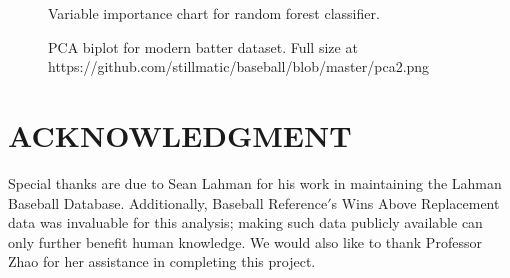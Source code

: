 \documentclass[letterpaper, 10 pt, conference]{ieeeconf}
\begin{document}
\begin{figure}[thpb]
\centering
{}
\caption{Variable importance chart for random forest classifier.}
\label{figurelabel}
\end{figure}

\begin{figure}[thpb]
\centering
{}
\caption{PCA biplot for modern batter dataset. Full size at https://github.com/stillmatic/baseball/blob/master/pca2.png}
\label{figurelabel}
\end{figure}

\section*{ACKNOWLEDGMENT}

Special thanks are due to Sean Lahman for his work in maintaining the Lahman Baseball Database. Additionally, Baseball Reference$'$s Wins Above Replacement data was invaluable for this analysis; making such data publicly available can only further benefit human knowledge. We would also like to thank Professor Zhao for her assistance in completing this project.

\end{document}
